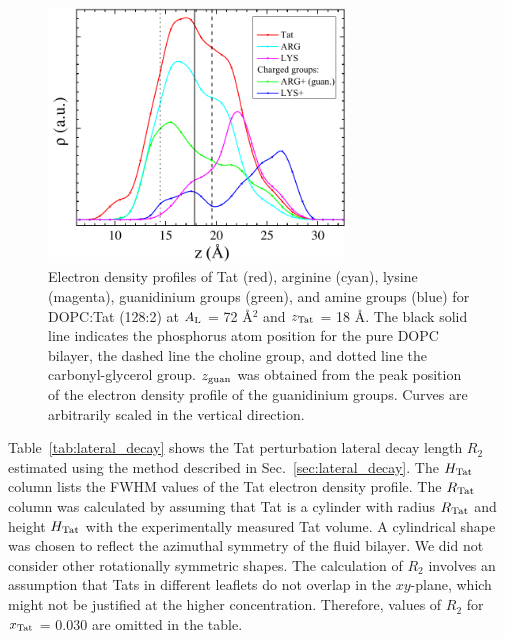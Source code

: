 \begin{figure}[htbp]
  \centering
  \includegraphics[width=0.7\textwidth]{figures/Tat/MD_Results/arginine-lysine/charged-groups}
  \caption[Electron density profiles of Tat (red), arginine (cyan), lysine (magenta),
  guanidinium groups (green), and amine groups (blue) 
  for DOPC:Tat (128:2) at $\AL$ = 72 \AA$^2$ and $\zTat$ = 18 \AA]
  {Electron density profiles of Tat (red), arginine (cyan), lysine (magenta),
  guanidinium groups (green), and amine groups (blue) 
  for DOPC:Tat (128:2) at $\AL$ = 72 \AA$^2$ and $\zTat$ = 18 \AA. 
  The black solid line indicates the phosphorus atom position for the pure DOPC
  bilayer, the dashed line the choline group, and dotted line the 
  carbonyl-glycerol group. $z_\textrm{guan}$ was obtained
  from the peak position of the electron density profile of the guanidinium groups.
  Curves are arbitrarily scaled in the vertical direction.}
  \label{fig:charged-groups}
\end{figure}

Table~\ref{tab:lateral_decay} shows the Tat perturbation lateral decay length 
$R_2$ estimated using the method described in Sec.~\ref{sec:lateral_decay}.
The $H_\textrm{Tat}$ column lists the FWHM values of the Tat electron density profile.
The $R_\textrm{Tat}$ column was calculated by assuming that Tat is a cylinder with
radius $R_\textrm{Tat}$ and height $H_\textrm{Tat}$ with the experimentally 
measured Tat volume. 
A cylindrical shape was chosen to reflect the azimuthal symmetry
of the fluid bilayer. We did not consider other rotationally symmetric shapes.
The calculation of $R_2$ involves an assumption that Tats in different leaflets
do not overlap in the $xy$-plane, which might not be justified at the higher 
concentration. Therefore, values of $R_2$ for $x_\textrm{Tat}$ = 0.030 are omitted in the table.

